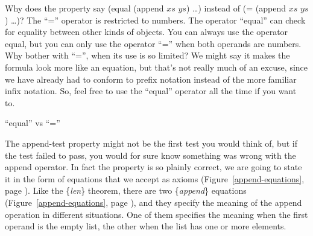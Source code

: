 \begin{aside}
Why does the property say (equal (append $xs$ $ys$) \dots)
instead of (= (append $xs$ $ys$) \dots)?
The ``='' operator
is restricted to numbers. The operator ``equal'' can check
for equality between other kinds of objects.
You can always use the operator equal,
but you can only use the operator ``='' when both operands are numbers.
Why bother with ``='', when its use is so limited?
We might say it makes the formula look more like an equation,
but that's not really much of an excuse,
since we have already had to conform to prefix notation
instead of the more familiar infix notation.
So, feel free to use the ``equal'' operator all the time if you want to.
\caption{``equal'' vs ``=''}
\label{equal}
\end{aside}

The append-test property might not be the first test you would think of,
but if the test failed to pass,
you would for sure know something was wrong with the append operator.
In fact the property is so plainly correct,
we are going to state it in the form of equations that we accept as axioms
(Figure~\ref{append-equations}, page \pageref{append-equations}).
Like the \{\emph{len}\} theorem, there are two \{\emph{append}\} equations
(Figure~\ref{append-equations}, page \pageref{append-equations}),
and they specify the meaning of the append operation in different situations.
One of them specifies the meaning when the first operand is the empty list,
the other when the list has one or more elements.

